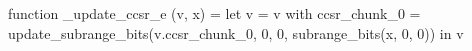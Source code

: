 function _update_ccsr_e (v, x) = let v = { v with ccsr_chunk_0 = update_subrange_bits(v.ccsr_chunk_0, 0, 0, subrange_bits(x, 0, 0)) } in
  v
